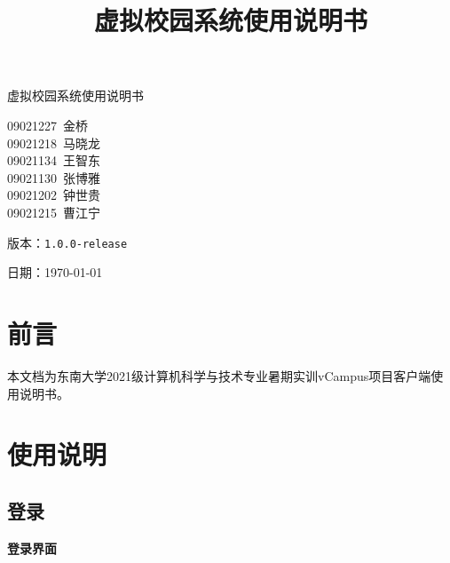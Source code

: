 \documentclass{article}
\title{虚拟校园系统使用说明书}
\begin{document}
\begin{titlepage}
  \vspace*{\fill}

  \begin{center}
    {\Huge 虚拟校园系统使用说明书}

    \vspace{10cm}
    {\large
      09021227~金\phantom{金}桥 \\
      09021218~马晓龙 \\
      09021134~王智东 \\
      09021130~张博雅 \\
      09021202~钟世贵 \\
      09021215~曹江宁
    }

    \vspace{0.5cm}
    {\large 版本：\texttt{1.0.0-release}}


    \vspace{0.5cm}


    {\large 日期：\today}
  \end{center}

  \vspace*{\fill}
\end{titlepage}
\tableofcontents
\newpage

\section{前言}

本文档为东南大学2021级计算机科学与技术专业暑期实训vCampus项目客户端使用说明书。

\section{使用说明}
\subsection{登录}

\begin{center}
\textbf{登录界面}
\end{center}
\end{document}
